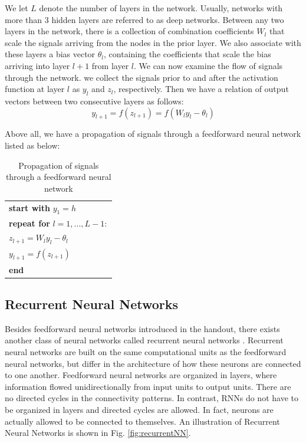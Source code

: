 \documentclass[journal,a4paper,onecolumn,11pt]{IEEEtran}
\begin{document}
We let $L$ denote the number of layers in the network. Usually, networks with more than $3$ hidden layers are referred to as deep networks. Between any two layers in the network, there is a collection of combination coefficients $W_l$ that scale the signals arriving from the nodes in the prior layer. We also associate with these layers a bias vector $\theta_l$, containing the coefficients that scale the bias arriving into layer $l+1$ from layer $l$. We can now examine the flow of signals through the network. we collect the signals prior to and after the activation function at layer $l$ as $y_l$ and $z_l$, respectively. Then we have a relation of output vectors between two consecutive layers as follows:
\begin{equation}
y_{l+1} = f(z_{l+1}) = f(W_l y_l - \theta_l)
\end{equation}

Above all, we have a propagation of signals through a feedforward neural network listed as below:
\begin{table}[!h]
	\renewcommand{\arraystretch}{1.3}
	\caption{Propagation of signals through a feedforward neural network}
	\label{tab:proffNN}
	\centering
	\begin{tabular*}{0.5\textwidth}{l}
		\hline
		{\bfseries start with} $y_1=h$\\
		{\bfseries repeat for} $l = 1,...,L-1:$ \\
		\quad $z_{l+1} = W_l y_l - \theta_l$ \\
		\quad $y_{l+1} = f(z_{l+1})$ \\
		{\bfseries end} \\
		\hline
	\end{tabular*}
\end{table}

\subsection{Recurrent Neural Networks}
Besides feedforward neural networks introduced in the handout, there exists another class of neural networks called recurrent neural networks \cite{bib:RNN1}. Recurrent neural networks are built on the same computational units as the feedforward neural networks, but differ in the architecture of how these neurons are connected to one another. Feedforward neural networks are organized in layers, where information flowed unidirectionally from input units to output units. There are no directed cycles in the connectivity patterns. In contrast, RNNs do not have to be organized in layers and directed cycles are allowed. In fact, neurons are actually allowed to be connected to themselves. An illustration of Recurrent Neural Networks is shown in Fig. \ref{fig:recurrentNN}.
\end{document}
